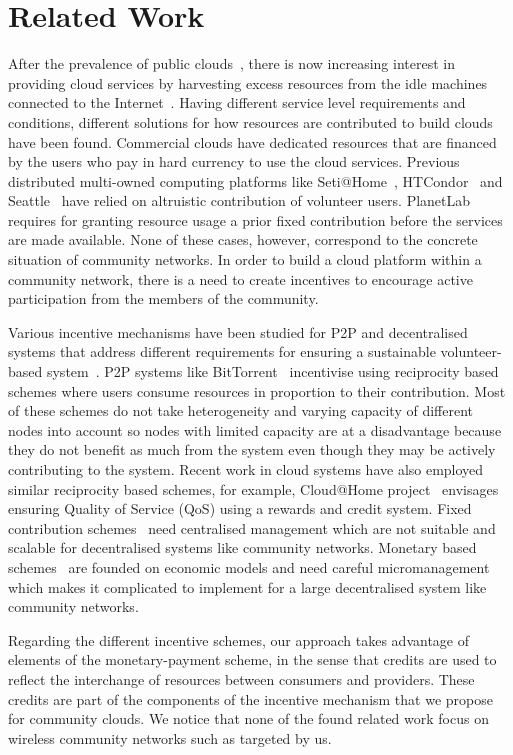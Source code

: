 

\section{Related Work}
\label{sec:related-work}

After the prevalence of public clouds~\cite{Armbrust2009}, there is now increasing interest in providing cloud services by harvesting excess resources from the idle machines connected to the Internet~\cite{Marinos2009}. 
Having different service level requirements and conditions, different solutions for how resources are contributed to build clouds have been found. Commercial clouds have dedicated resources that are financed by the users who pay in hard currency to use the cloud services.
Previous distributed multi-owned computing platforms like Seti@Home~\cite{Anderson2002}, HTCondor~\cite{Thain2005} and Seattle~\cite{Cappos2009} have relied on altruistic contribution of volunteer users. 
PlanetLab~\cite{Chun2003} requires for granting resource usage a prior fixed contribution before the services are made available.
None of these cases, however, correspond to the concrete situation of community networks.
In order to build a cloud platform within a community network, there is a need to create incentives to encourage active participation from the members of the community. 

Various incentive mechanisms have been studied for P2P and decentralised systems that address different requirements for ensuring a sustainable volunteer-based system~\cite{Zhang2010}.
P2P systems like BitTorrent~\cite{Cohen2003} incentivise using reciprocity based schemes where users consume resources in proportion to their contribution.
Most of these schemes do not take heterogeneity and varying capacity of different nodes into account so nodes with limited capacity are at a disadvantage because they do not benefit as much from the system even though they may be actively contributing to the system.
Recent work in cloud systems have also employed similar reciprocity based schemes, for example, Cloud@Home project~\cite{Distefano2012} envisages ensuring Quality of Service (QoS) using a rewards and credit system.
Fixed contribution schemes~\cite{Chun2003} need centralised management which are not suitable and scalable for decentralised systems like community networks.
Monetary based schemes~\cite{Punceva2013, Roovers2011, Petri2010, Toka2007} are founded on economic models and need careful micromanagement which makes it complicated to implement for a large decentralised system like community networks.

Regarding the different incentive schemes, our approach takes advantage of elements of the monetary-payment scheme, in the sense that credits are used to reflect the interchange of resources between consumers and providers. 
These credits are part of the components of the incentive mechanism that we propose for community clouds. 
We notice that none of the found related work focus on wireless community networks such as targeted by us.

